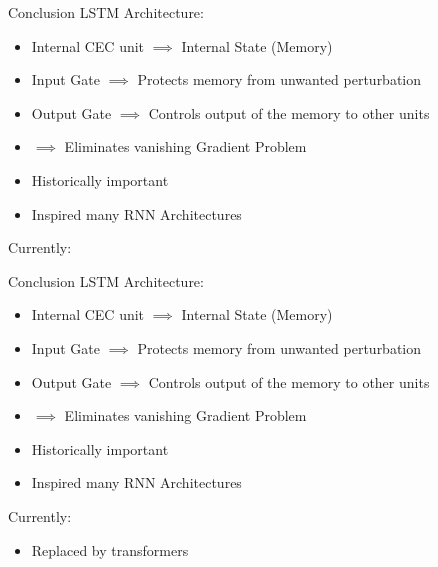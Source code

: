 \documentclass[10pt, aspectratio=169]{beamer}
\begin{document}
\begin{frame}[t]{Conclusion}
LSTM Architecture:
\begin{itemize}
    \item Internal CEC unit \begin{math}\implies \end{math} Internal State (Memory)
    \item Input Gate \begin{math}\implies\end{math} Protects memory from unwanted perturbation
    \item Output Gate \begin{math}\implies\end{math} Controls output of the memory to other units
    \item \begin{math}\implies\end{math} Eliminates vanishing Gradient Problem
    \item Historically important 
    \item Inspired many RNN Architectures
\end{itemize}
Currently:
\end{frame}

\begin{frame}[t]{Conclusion}
LSTM Architecture:
\begin{itemize}
    \item Internal CEC unit \begin{math}\implies \end{math} Internal State (Memory)
    \item Input Gate \begin{math}\implies\end{math} Protects memory from unwanted perturbation
    \item Output Gate \begin{math}\implies\end{math} Controls output of the memory to other units
    \item \begin{math}\implies\end{math} Eliminates vanishing Gradient Problem
    \item Historically important 
    \item Inspired many RNN Architectures
\end{itemize}
Currently:
\begin{itemize}
    \item Replaced by transformers
\end{itemize}
\end{frame}
\end{document}
